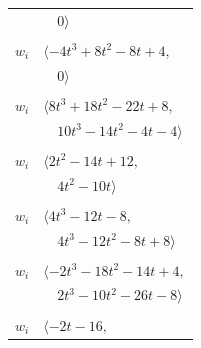 \documentclass[11pt]{article}
\begin{document}
\begin{longtable}{@{}ll@{}}
 & $\quad 0\rangle$\\
\addlinespace[2pt]
\multicolumn{2}{@{}p{0.97\textwidth}@{}}{$i=18$, $D_i=1$, $\rho_{ij}$: $5{:}2, \allowbreak 6{:}2, \allowbreak 8{:}1, \allowbreak 13{:}2, \allowbreak 22{:}2, \allowbreak 24{:}2, \allowbreak 25{:}1, \allowbreak 26{:}1$}\\
$w_i$ & $\langle -4t^{3}+8t^{2}-8t+4,$\\
 & $\quad 0\rangle$\\
\addlinespace[2pt]
\multicolumn{2}{@{}p{0.97\textwidth}@{}}{$i=19$, $D_i=1$, $\rho_{ij}$: $3{:}2, \allowbreak 6{:}2, \allowbreak 7{:}1, \allowbreak 15{:}2, \allowbreak 17{:}2, \allowbreak 21{:}1, \allowbreak 27{:}1, \allowbreak 28{:}2, \allowbreak 33{:}1$}\\
$w_i$ & $\langle 8t^{3}+18t^{2}-22t+8,$\\
 & $\quad 10t^{3}-14t^{2}-4t-4\rangle$\\
\addlinespace[2pt]
\multicolumn{2}{@{}p{0.97\textwidth}@{}}{$i=20$, $D_i=1$, $\rho_{ij}$: $4{:}2, \allowbreak 9{:}2, \allowbreak 12{:}2, \allowbreak 16{:}1, \allowbreak 21{:}1, \allowbreak 25{:}1, \allowbreak 26{:}1$}\\
$w_i$ & $\langle 2t^{2}-14t+12,$\\
 & $\quad 4t^{2}-10t\rangle$\\
\addlinespace[2pt]
\multicolumn{2}{@{}p{0.97\textwidth}@{}}{$i=21$, $D_i=1$, $\rho_{ij}$: $11{:}2, \allowbreak 15{:}2, \allowbreak 19{:}2, \allowbreak 20{:}2, \allowbreak 22{:}2, \allowbreak 24{:}2, \allowbreak 27{:}1, \allowbreak 30{:}1, \allowbreak 32{:}2, \allowbreak 33{:}2$}\\
$w_i$ & $\langle 4t^{3}-12t-8,$\\
 & $\quad 4t^{3}-12t^{2}-8t+8\rangle$\\
\addlinespace[2pt]
\multicolumn{2}{@{}p{0.97\textwidth}@{}}{$i=22$, $D_i=1$, $\rho_{ij}$: $6{:}1, \allowbreak 11{:}1, \allowbreak 14{:}2, \allowbreak 18{:}1, \allowbreak 21{:}1, \allowbreak 23{:}2, \allowbreak 24{:}1, \allowbreak 26{:}1, \allowbreak 30{:}2$}\\
$w_i$ & $\langle -2t^{3}-18t^{2}-14t+4,$\\
 & $\quad 2t^{3}-10t^{2}-26t-8\rangle$\\
\addlinespace[2pt]
\multicolumn{2}{@{}p{0.97\textwidth}@{}}{$i=23$, $D_i=1$, $\rho_{ij}$: $6{:}2, \allowbreak 11{:}1, \allowbreak 12{:}1, \allowbreak 22{:}1, \allowbreak 26{:}2, \allowbreak 27{:}2$}\\
$w_i$ & $\langle -2t-16,$\\

\end{longtable}
\end{document}
